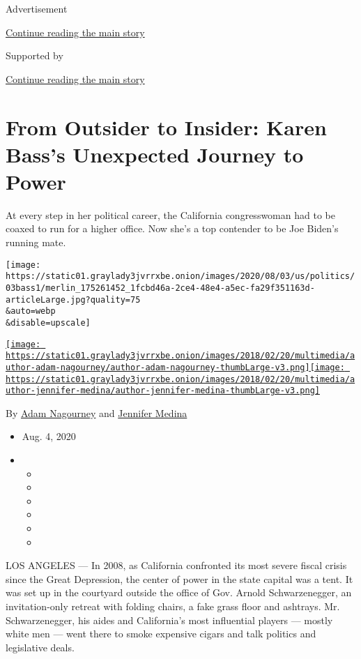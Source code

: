 Advertisement

\protect\hyperlink{after-top}{Continue reading the main story}

Supported by

\protect\hyperlink{after-sponsor}{Continue reading the main story}

\hypertarget{from-outsider-to-insider-karen-basss-unexpected-journey-to-power}{%
\section{From Outsider to Insider: Karen Bass's Unexpected Journey to
Power}\label{from-outsider-to-insider-karen-basss-unexpected-journey-to-power}}

At every step in her political career, the California congresswoman had
to be coaxed to run for a higher office. Now she's a top contender to be
Joe Biden's running mate.

\texttt{[image: https://static01.graylady3jvrrxbe.onion/images/2020/08/03/us/politics/03bass1/merlin\_175261452\_1fcbd46a-2ce4-48e4-a5ec-fa29f351163d-articleLarge.jpg?quality=75\\\&auto=webp\\\&disable=upscale]}

\href{https://www.nytimes3xbfgragh.onion/by/adam-nagourney}{\texttt{[image: https://static01.graylady3jvrrxbe.onion/images/2018/02/20/multimedia/author-adam-nagourney/author-adam-nagourney-thumbLarge-v3.png]}}\href{https://www.nytimes3xbfgragh.onion/by/jennifer-medina}{\texttt{[image: https://static01.graylady3jvrrxbe.onion/images/2018/02/20/multimedia/author-jennifer-medina/author-jennifer-medina-thumbLarge-v3.png]}}

By \href{https://www.nytimes3xbfgragh.onion/by/adam-nagourney}{Adam
Nagourney} and
\href{https://www.nytimes3xbfgragh.onion/by/jennifer-medina}{Jennifer
Medina}

\begin{itemize}
\item
  Aug. 4, 2020
\item
  \begin{itemize}
  \item
  \item
  \item
  \item
  \item
  \item
  \end{itemize}
\end{itemize}

LOS ANGELES --- In 2008, as California confronted its most severe fiscal
crisis since the Great Depression, the center of power in the state
capital was a tent. It was set up in the courtyard outside the office of
Gov. Arnold Schwarzenegger, an invitation-only retreat with folding
chairs, a fake grass floor and ashtrays. Mr. Schwarzenegger, his aides
and California's most influential players --- mostly white men --- went
there to smoke expensive cigars and talk politics and legislative deals.

